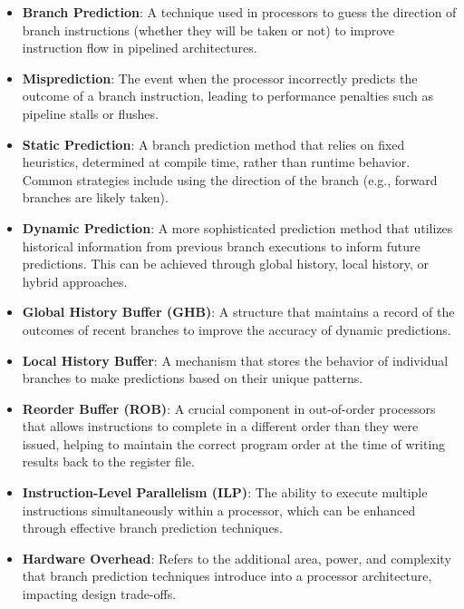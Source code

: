 \documentclass[10pt,journal,compsoc]{IEEEtran}
\begin{document}
\begin{itemize}
    \item \textbf{Branch Prediction}: A technique used in processors to guess the direction of branch instructions (whether they will be taken or not) to improve instruction flow in pipelined architectures.
    
    \item \textbf{Misprediction}: The event when the processor incorrectly predicts the outcome of a branch instruction, leading to performance penalties such as pipeline stalls or flushes.
    
    \item \textbf{Static Prediction}: A branch prediction method that relies on fixed heuristics, determined at compile time, rather than runtime behavior. Common strategies include using the direction of the branch (e.g., forward branches are likely taken).
    
    \item \textbf{Dynamic Prediction}: A more sophisticated prediction method that utilizes historical information from previous branch executions to inform future predictions. This can be achieved through global history, local history, or hybrid approaches.
    
    \item \textbf{Global History Buffer (GHB)}: A structure that maintains a record of the outcomes of recent branches to improve the accuracy of dynamic predictions.
    
    \item \textbf{Local History Buffer}: A mechanism that stores the behavior of individual branches to make predictions based on their unique patterns.
        
    \item \textbf{Reorder Buffer (ROB)}: A crucial component in out-of-order processors that allows instructions to complete in a different order than they were issued, helping to maintain the correct program order at the time of writing results back to the register file.
    
    \item \textbf{Instruction-Level Parallelism (ILP)}: The ability to execute multiple instructions simultaneously within a processor, which can be enhanced through effective branch prediction techniques.
    
    \item \textbf{Hardware Overhead}: Refers to the additional area, power, and complexity that branch prediction techniques introduce into a processor architecture, impacting design trade-offs.
    

\end{itemize}
\end{document}

